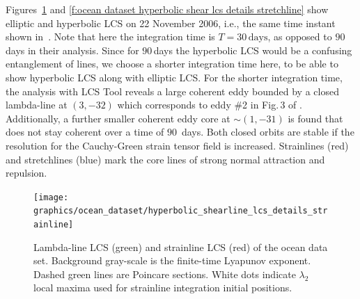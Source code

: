 \documentclass{article}
\begin{document}
Figures~\ref{f:ocean dataset hyperbolic shear lcs details strainline} and \ref{f:ocean dataset hyperbolic shear lcs details stretchline} show elliptic and hyperbolic LCS on 22 November 2006, i.e., the same time instant shown in~\textcite{haller13:_coher_lagran,beron-vera13:_objec_agulh}. Note that here the integration time is $T=30\,\mathrm{days}$, as opposed to $90$\,days in their analysis. Since for $90$\,days the hyperbolic LCS would be a confusing entanglement of lines, we choose a shorter integration time here, to be able to show hyperbolic LCS along with elliptic LCS. 
For the shorter integration time, the analysis with LCS Tool reveals a large coherent eddy bounded by a closed lambda-line at $(3,-32)$ which corresponds to eddy \#2 in Fig.\,3 of \textcite{beron-vera13:_objec_agulh}. Additionally, a further smaller coherent eddy core at $\sim(1,-31)$ is found that does not stay coherent over a time of $90$\, days. Both closed orbits are stable if the resolution for the Cauchy-Green strain tensor field is increased. Strainlines (red) and stretchlines (blue) mark the core lines of strong normal attraction and repulsion.



\begin{figure}
\begin{center}
\texttt{[image: graphics/ocean\_dataset/hyperbolic\_shearline\_lcs\_details\_strainline]}
\end{center}
\caption{Lambda-line LCS (green) and strainline LCS (red) of the ocean data set. Background gray-scale is the finite-time Lyapunov exponent. Dashed green lines are Poincare sections. White dots indicate $\lambda_2$ local maxima used for strainline integration initial positions.}
\label{f:ocean dataset hyperbolic shear lcs details strainline}
\end{figure}
\end{document}
